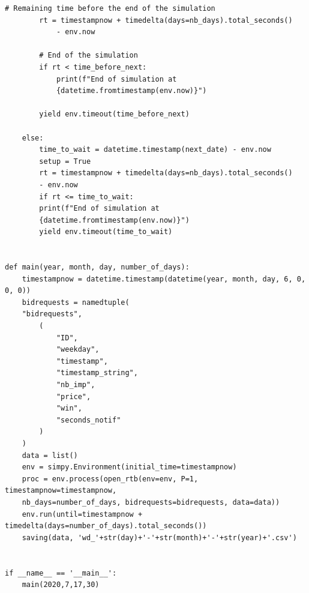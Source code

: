 \documentclass[12pt]{article}
\begin{document}
\begin{lstlisting}[style=Python]
		# Remaining time before the end of the simulation
		rt = timestampnow + timedelta(days=nb_days).total_seconds() 
			- env.now
		
		# End of the simulation
		if rt < time_before_next:
			print(f"End of simulation at 
			{datetime.fromtimestamp(env.now)}")
		
		yield env.timeout(time_before_next)
	
	else:
		time_to_wait = datetime.timestamp(next_date) - env.now
		setup = True
		rt = timestampnow + timedelta(days=nb_days).total_seconds() 
		- env.now
		if rt <= time_to_wait:
		print(f"End of simulation at 
		{datetime.fromtimestamp(env.now)}")
		yield env.timeout(time_to_wait)


def main(year, month, day, number_of_days):
	timestampnow = datetime.timestamp(datetime(year, month, day, 6, 0, 0, 0))
	bidrequests = namedtuple(
	"bidrequests",
		(
			"ID",
			"weekday",
			"timestamp",
			"timestamp_string",
			"nb_imp",
			"price",
			"win",
			"seconds_notif"
		)
	)
	data = list()
	env = simpy.Environment(initial_time=timestampnow)
	proc = env.process(open_rtb(env=env, P=1, timestampnow=timestampnow, 
	nb_days=number_of_days, bidrequests=bidrequests, data=data))
	env.run(until=timestampnow + timedelta(days=number_of_days).total_seconds())
	saving(data, 'wd_'+str(day)+'-'+str(month)+'-'+str(year)+'.csv')


if __name__ == '__main__':
	main(2020,7,17,30)

\end{lstlisting}
\end{document}

